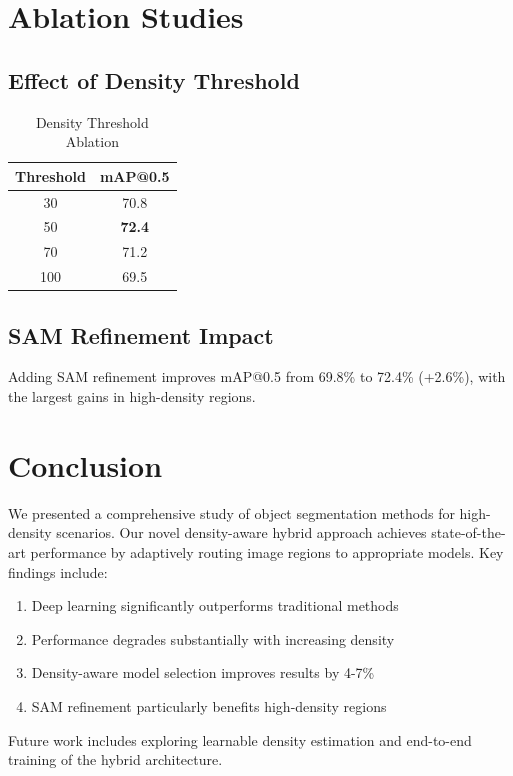 \documentclass[conference]{IEEEtran}
\begin{document}
\section{Ablation Studies}

\subsection{Effect of Density Threshold}

\begin{table}[H]
\centering
\caption{Density Threshold Ablation}
\begin{tabular}{cc}
\toprule
\textbf{Threshold} & \textbf{mAP@0.5} \\
\midrule
30 & 70.8 \\
50 & \textbf{72.4} \\
70 & 71.2 \\
100 & 69.5 \\
\bottomrule
\end{tabular}
\end{table}

\subsection{SAM Refinement Impact}

Adding SAM refinement improves mAP@0.5 from 69.8\% to 72.4\% (+2.6\%), with the largest gains in high-density regions.

\section{Conclusion}

We presented a comprehensive study of object segmentation methods for high-density scenarios. Our novel density-aware hybrid approach achieves state-of-the-art performance by adaptively routing image regions to appropriate models. Key findings include:

\begin{enumerate}
    \item Deep learning significantly outperforms traditional methods
    \item Performance degrades substantially with increasing density
    \item Density-aware model selection improves results by 4-7\%
    \item SAM refinement particularly benefits high-density regions
\end{enumerate}

Future work includes exploring learnable density estimation and end-to-end training of the hybrid architecture.



\end{document}
